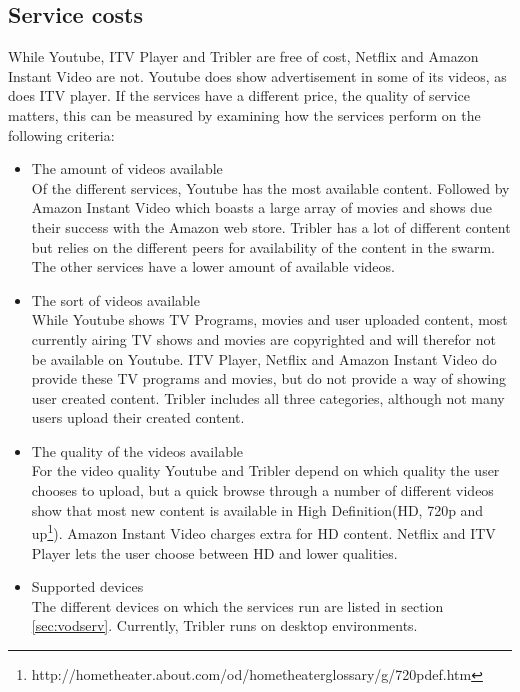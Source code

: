 \subsection{Service costs}
While Youtube, ITV Player and Tribler are free of cost, Netflix and Amazon Instant Video are not. Youtube does show advertisement in some of its videos, as does ITV player. If the services have a different price, the quality of service matters, this can be measured by examining how the services perform on the following criteria:
\begin{itemize}
\item The amount of videos available\\
Of the different services, Youtube has the most available content. Followed by Amazon Instant Video which boasts a large array of movies and shows due their success with the Amazon web store. Tribler has a lot of different content but relies on the different peers for availability of the content in the swarm. The other services have a lower amount of available videos.
\item The sort of videos available\\
While Youtube shows TV Programs, movies and user uploaded content, most currently airing TV shows and movies are copyrighted and will therefor not be available on Youtube. ITV Player, Netflix and Amazon Instant Video do provide these TV programs and movies, but do not provide a way of showing user created content. Tribler includes all three categories, although not many users upload their created content.
\item The quality of the videos available\\
For the video quality Youtube and Tribler depend on which quality the user chooses to upload, but a quick browse through a number of different videos show that most new content is available in  High Definition(HD, 720p and up\footnote{http://hometheater.about.com/od/hometheaterglossary/g/720pdef.htm}). Amazon Instant Video charges extra for HD content. Netflix and ITV Player lets the user choose between HD and lower qualities.
\item Supported devices\\
The different devices on which the services run are listed in section \ref{sec:vodserv}. Currently, Tribler runs on desktop environments.
\end{itemize}
